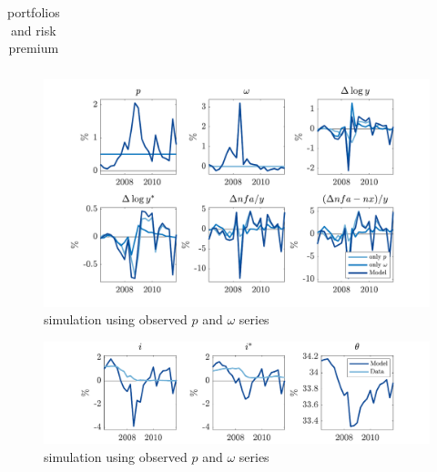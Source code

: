 \documentclass[12pt]{article}
\begin{document}
\begin{table}[H]
\centering
\bgroup
\def\arraystretch{1.25}
\hspace*{-2cm}\begin{tabular}{l|ccccc} \hline

\end{tabular}
\egroup
\renewcommand\thetable{10}
\caption{portfolios and risk premium}
\end{table}

\begin{figure}[H]
\centering
\includegraphics[width=\textwidth,clip=true,trim=0 0 0 0]{../output/figures/fig_6}
\renewcommand\thefigure{6}
\caption{simulation using observed $p$ and $\omega$ series}
\end{figure}

\begin{figure}[H]
\centering
\includegraphics[width=\textwidth,clip=true,trim=0 0 0 0]{../output/figures/fig_7}
\renewcommand\thefigure{7}
\caption{simulation using observed $p$ and $\omega$ series}
\end{figure}
\end{document}
